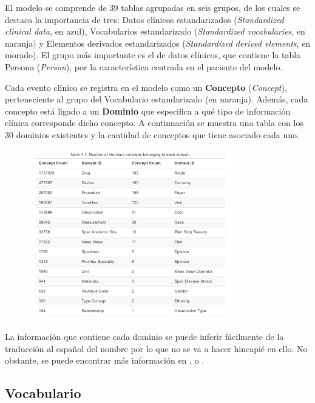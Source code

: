 El modelo se comprende de 39 tablas agrupadas en seis grupos, de los cuales se destaca la importancia de tres: Datos clínicos estandarizados (\textit{Standardized clinical data}, en azul), Vocabularios estandarizado (\textit{Standardized vocabularies}, en naranja) y Elementos derivados estandarizados (\textit{Standardized derived elements}, en morado). El grupo más importante es el de datos clínicos, que contiene la tabla Persona (\textit{Person}), por la característica centrada en el paciente del modelo.

Cada evento clínico se registra en el modelo como un \textbf{Concepto} (\textit{Concept}), perteneciente al grupo del Vocabulario estandarizado (en naranja). Además, cada concepto está ligado a un \textbf{Dominio} que especifica a qué tipo de información clínica corresponde dicho concepto. A continuación se muestra una tabla con los 30 dominios existentes y la cantidad de conceptos que tiene asociado cada uno.

\begin{figure}[H]
    \centering
    \includegraphics[width=0.80\textwidth]{figures/cdm_domains.png}
    \label{fig:cdm_domains}
\end{figure}

La información que contiene cada dominio se puede inferir fácilmente de la traducción al español del nombre por lo que no se va a hacer hincapié en ello. No obstante, se puede encontrar más información en \cite{OHDSIbook}, \cite{gitPagesCMD} o \cite{CDMinteractive}.

\subsection{Vocabulario}\label{subsec:07vocab}


